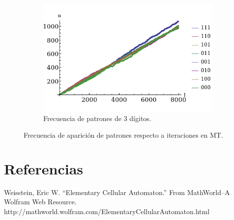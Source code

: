 \documentclass[letterpaper,11pt]{article}
\begin{document}
\begin{figure}[h!]
\begin{subfigure}{.5\textwidth}
	\centering
	\includegraphics[scale=0.55]{img/Mersenne_Grupo3}
	\caption{Frecuencia de patrones de 3 dígitos.}
\end{subfigure}%
\caption{Frecuencia de aparición de patrones respecto a iteraciones en MT.}
\label{fig:acpat2}
\end{figure}


\section{Referencias}
\renewcommand*{\refname}{}
\begin{thebibliography}{100}
 Weisstein, Eric W. \enquote{Elementary Cellular Automaton.} From MathWorld--A Wolfram Web Resource. http://mathworld.wolfram.com/ElementaryCellularAutomaton.html

\end{thebibliography}
\end{document}
